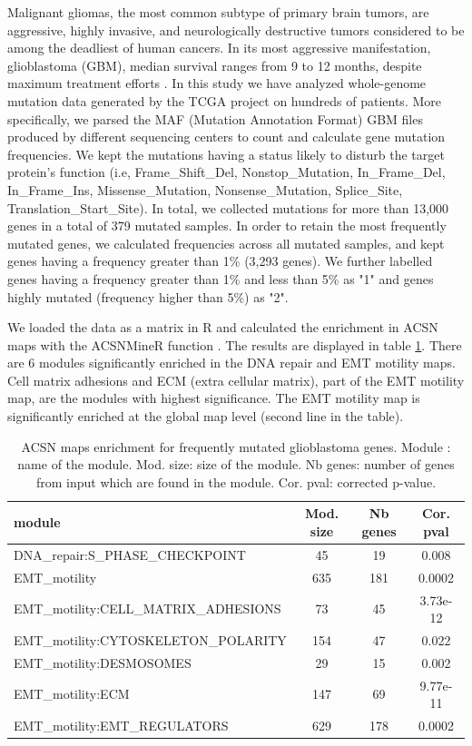 Malignant gliomas, the most common subtype of primary brain tumors, are
aggressive, highly invasive, and neurologically destructive tumors considered
to be among the deadliest of human cancers. In its most aggressive
manifestation, glioblastoma (GBM), median survival ranges from 9 to 12 months,
despite maximum treatment efforts \citep{maher2001malignant}. In this study we
have analyzed whole-genome mutation data generated by the TCGA project on
hundreds of patients. More specifically, we parsed the MAF (Mutation Annotation
Format) GBM files produced by different sequencing centers to count and
calculate gene mutation frequencies. We kept the mutations having a status
likely to disturb the target protein's function (i.e, Frame\_Shift\_Del,
Nonstop\_Mutation, In\_Frame\_Del, In\_Frame\_Ins, Missense\_Mutation,
Nonsense\_Mutation, Splice\_Site, Translation\_Start\_Site). In total, we
collected mutations for more than 13,000 genes in a total of 379 mutated
samples. In order to retain the most frequently mutated genes, we calculated
frequencies across all mutated samples, and kept genes having a frequency
greater than 1\% (3,293 genes). We further labelled genes having a frequency
greater than 1\% and less than 5\% as "1" and genes highly mutated (frequency
higher than 5\%) as "2". 

We loaded the data as a matrix in R and calculated the enrichment in ACSN maps
with the ACSNMineR function . The results are displayed in
table \ref{tab:table_gbm}. There are 6 modules significantly enriched in the
DNA repair and EMT motility maps. Cell matrix adhesions and ECM
(extra cellular matrix), part of the EMT motility map, are the modules with
highest significance. The EMT motility map is significantly enriched at the
global map level (second line in the table). 

\begin{table}[h!]
  \centering
  \caption{ACSN maps enrichment for frequently mutated glioblastoma genes.
  Module : name of the module. Mod. size: size of the module. Nb genes: number
  of genes from input which are found in the module. Cor. pval: corrected
  p-value.} 
  \label{tab:table_gbm}

\begin{tabular}{l c c c}
\toprule
module & Mod. size & Nb genes & Cor. pval\\ 
\midrule
DNA\_repair:S\_PHASE\_CHECKPOINT &   45 &      19 &     0.008\\
EMT\_motility  &  635  &   181  &   0.0002\\
EMT\_motility:CELL\_MATRIX\_ADHESIONS   &   73  &    45  &    3.73e-12\\
EMT\_motility:CYTOSKELETON\_POLARITY   &   154 &    47  &    0.022\\
EMT\_motility:DESMOSOMES & 29  &    15  &    0.002\\
EMT\_motility:ECM    &    147  &   69   &   9.77e-11\\
EMT\_motility:EMT\_REGULATORS  &   629   &  178  &   0.0002\\
\bottomrule
\end{tabular}
\end{table}

